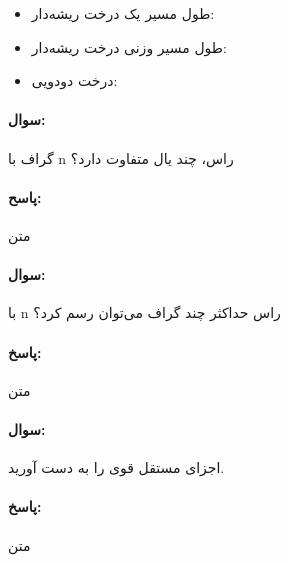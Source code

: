 \documentclass[a4paper,10pt]{article}
\begin{document}
\begin{itemize}
\begin{itemize}
            \item زیردرخت\footnote{\hspace{2pt}Subtree}: هر راس و تمامی رئوس و یال‌های منشعب از آن راس تشکیل یک زیر درخت از درخت اصلی را می‌دهند.

            \item برگ: رئوسی که فرزندی ندارند و در انتهای شاخه‌های درخت قرار دارند.

        \end{itemize}
        
        \item طول مسیر یک درخت ریشه‌دار: 
        
        \item طول مسیر وزنی درخت ریشه‌دار: 
        
        \item درخت دودویی: 

    \end{itemize}

    \noindent\hrulefill

    \paragraph{سوال:} گراف با n راس، چند یال متفاوت دارد؟

    \paragraph{پاسح:} متن

    \noindent\hrulefill

    \paragraph{سوال:} با n راس حداکثر چند گراف می‌توان رسم کرد؟

    \paragraph{پاسخ:} متن

    \noindent\hrulefill

    \paragraph{سوال:} اجزای مستقل قوی را به دست آورید.

    \paragraph{پاسخ:} متن
\end{document}
